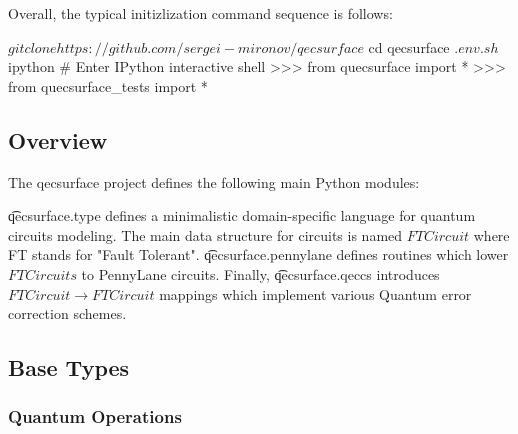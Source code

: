 Overall, the typical initizlization command sequence is follows:

\begin{sh}
$ git clone https://github.com/sergei-mironov/qecsurface
$ cd qecsurface
$ . env.sh
$ ipython # Enter IPython interactive shell
>>> from quecsurface import *
>>> from quecsurface_tests import *
\end{sh}

\subsection{Overview}

The qecsurface project defines the following main Python modules:

\ls \t{qecsurface.type} defines a minimalistic domain-specific language for quantum circuits
    modeling. The main data structure for circuits is named $FTCircuit$ where FT stands for
    "Fault Tolerant".
\li \t{qecsurface.pennylane} defines routines which lower $FTCircuits$ to PennyLane circuits.
\li Finally, \t{qecsurface.qeccs} introduces $FTCircuit \to FTCircuit$ mappings
    which implement various Quantum error correction schemes.
\le

\subsection{Base Types}

\subsubsection{Quantum Operations}

